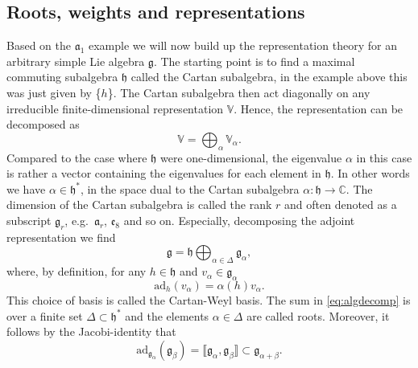 \subsection{Roots, weights and representations}
Based on the $\mathfrak{a}_1$ example we will now build up the representation theory for an arbitrary simple Lie algebra $\mathfrak{g}$. The starting point is to find a maximal commuting subalgebra $\mathfrak{h}$ called the Cartan subalgebra, in the example above this was just given by \{$h$\}. The Cartan subalgebra then act diagonally on any irreducible finite-dimensional representation $\mathbb{V}$. Hence, the representation can be decomposed as 
\begin{equation}
    \mathbb{V} = \bigoplus_\alpha \mathbb{V}_\alpha.
\end{equation}
Compared to the case where $\mathfrak{h}$ were one-dimensional, the eigenvalue $\alpha$ in this case is rather a vector containing the eigenvalues for each element in $\mathfrak{h}$. In other words we have $\alpha\in \mathfrak{h}^*$, in the space dual to the Cartan subalgebra $\alpha:\mathfrak{h}\to \mathbb{C}$. The dimension of the Cartan subalgebra is called the rank $r$ and often denoted as a subscript $\mathfrak{g}_r$, e.g.\ $\mathfrak{a}_r$, $\mathfrak{e}_8$ and so on. Especially, decomposing the adjoint representation we find
\begin{equation}\label{eq:algdecomp}
    \mathfrak{g} = \mathfrak{h}\bigoplus_{\alpha\in\Delta} \mathfrak{g}_\alpha,
\end{equation}
where, by definition, for any $h\in\mathfrak{h}$ and $v_\alpha\in\mathfrak{g}_\alpha$ 
\begin{equation}
    \text{ad}_h(v_\alpha) = \alpha(h)v_\alpha.
\end{equation}
This choice of basis is called the Cartan-Weyl basis. The sum in \eqref{eq:algdecomp} is over a finite set $\Delta\subset\mathfrak{h}^*$ and the elements $\alpha\in\Delta$ are called roots. Moreover, it follows by the Jacobi-identity that 
\begin{equation}
    \text{ad}_{\mathfrak{g}_\alpha}(\mathfrak{g}_\beta) = \llbracket\mathfrak{g}_\alpha,\mathfrak{g}_\beta\rrbracket \subset \mathfrak{g}_{\alpha+\beta}.
\end{equation}
